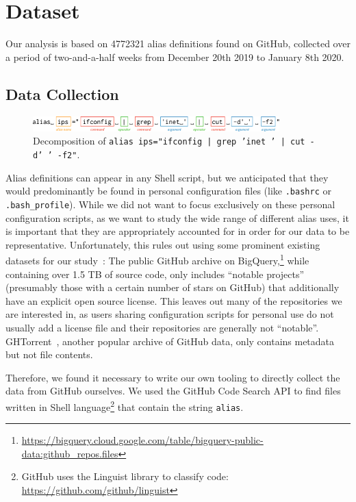 \section{Dataset}

Our analysis is based on \num{4772321} alias definitions found on GitHub, collected over a period of two-and-a-half weeks from December 20th 2019 to January 8th 2020.

\subsection{Data Collection}

\begin{figure}
	\centering
	\includegraphics[width=0.85\textwidth]{parser_breakdown.pdf}
	\caption{Decomposition of \texttt{alias ips="ifconfig | grep 'inet ' | cut -d' ' -f2"}.}
	\label{fig:parser}
\end{figure}

Alias definitions can appear in any Shell script, but we anticipated that they would predominantly be found in personal configuration files (like \verb|.bashrc| or \verb|.bash_profile|).
While we did not want to focus exclusively on these personal configuration scripts, as we want to study the wide range of different alias uses, it is important that they are appropriately accounted for in order for our data to be representative.
Unfortunately, this rules out using some prominent existing datasets for our study~\cite{mombach}:
The public GitHub archive on BigQuery,\footnote{\url{https://bigquery.cloud.google.com/table/bigquery-public-data:github_repos.files}} while containing over 1.5 TB of source code, only includes ``notable projects'' (presumably those with a certain number of stars on GitHub) that additionally have an explicit open source license. 
This leaves out many of the repositories we are interested in, as users sharing configuration scripts for personal use do not usually add a license file and their repositories are generally not ``notable''.
GHTorrent~\cite{ghtorrent}, another popular archive of GitHub data, only contains metadata but not file contents.

Therefore, we found it necessary to write our own tooling to directly collect the data from GitHub ourselves.
We used the GitHub Code Search API to find files written in Shell language\footnote{GitHub uses the Linguist library to classify code: \url{https://github.com/github/linguist}} that contain the string \verb|alias|.

